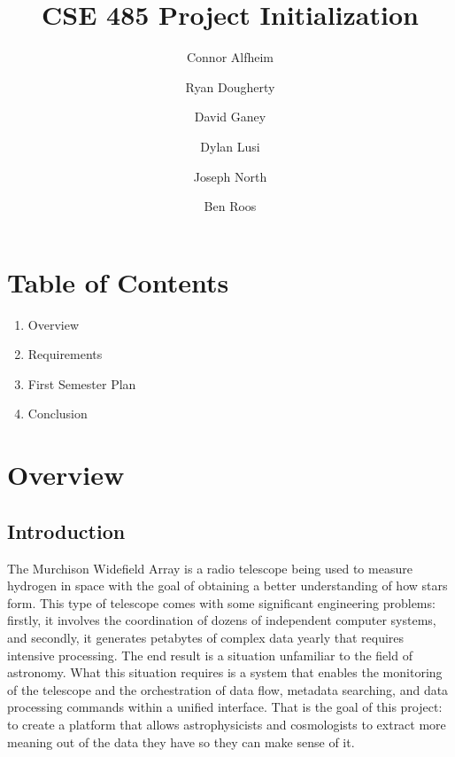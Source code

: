 \documentclass[12pt]{article}
\begin{document}
\begin{spacing}{.4}
\setlength{\droptitle}{-7em}
\title{CSE 485 Project Initialization}
\author{Connor Alfheim \and Ryan Dougherty \and David Ganey \and Dylan Lusi \and Joseph North \and Ben Roos}
\maketitle
\newpage
\end{spacing}

\begin{spacing}{1.5}

\section*{Table of Contents}
\begin{enumerate}
\item Overview
\item Requirements
\item First Semester Plan
\item Conclusion
\end{enumerate}
\newpage

\section{Overview}
\subsection{Introduction}
The Murchison Widefield Array is a radio telescope being used to measure hydrogen in space with the goal of obtaining a better understanding of how stars form. This type of telescope comes with some significant engineering problems: firstly, it involves the coordination of dozens of independent computer systems, and secondly, it generates petabytes of complex data yearly that requires intensive processing. The end result is a situation unfamiliar to the field of astronomy. What this situation requires is a system that enables the monitoring of the telescope and the orchestration of data flow, metadata searching, and data processing commands within a unified interface. That is the goal of this project: to create a platform that allows astrophysicists and cosmologists to extract more meaning out of the data they have so they can make sense of it.


\end{spacing}
\end{document}

